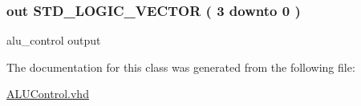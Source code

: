 \hypertarget{class_a_l_u___control_a770899168989eb2b8a2d815fbd0a3a17}{
\subsubsection[{\-A\-L\-U\-\_\-\-Control\-\_\-out}]{ {\bfseries out } {\bfseries \-S\-T\-D\-\_\-\-L\-O\-G\-I\-C\-\_\-\-V\-E\-C\-T\-O\-R (   3    downto    0  ) } }}\label{class_a_l_u___control_a770899168989eb2b8a2d815fbd0a3a17}


alu\-\_\-control output 



\-The documentation for this class was generated from the following file\-:\begin{DoxyCompactItemize}
\item 
\hyperlink{_a_l_u_control_8vhd}{\-A\-L\-U\-Control.\-vhd}\end{DoxyCompactItemize}
